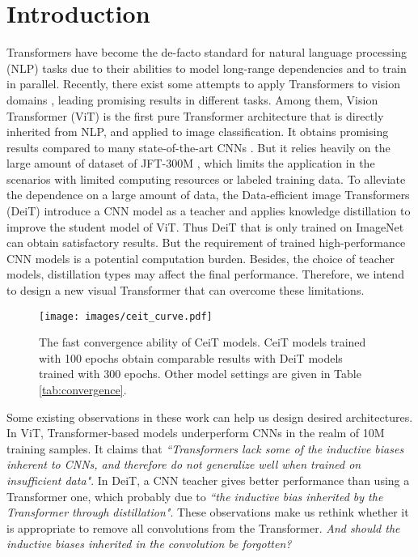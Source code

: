 \documentclass[10pt,twocolumn,letterpaper]{article}
\begin{document}
\section{Introduction}

Transformers \cite{DBLP:conf/nips/VaswaniSPUJGKP17} have become the de-facto standard for natural language processing (NLP) tasks due to their abilities to model long-range dependencies and to train in parallel. Recently, there exist some attempts to apply Transformers to vision domains \cite{DBLP:conf/icml/ChenRC0JLS20,dosovitskiy2021an,DBLP:journals/corr/abs-2012-12877,DBLP:conf/eccv/CarionMSUKZ20,zhu2021deformable,DBLP:journals/corr/abs-2012-00364,DBLP:journals/corr/abs-2012-15840}, leading promising results in different tasks. Among them, Vision Transformer (ViT) \cite{dosovitskiy2021an} is the first pure Transformer architecture that is directly inherited from NLP, and applied to image classification. 
It obtains promising results compared to many state-of-the-art CNNs \cite{DBLP:conf/eccv/MahajanGRHPLBM18,DBLP:conf/cvpr/XieLHL20,DBLP:conf/eccv/KolesnikovBZPYG20}. 
But it relies heavily on the large amount of dataset of JFT-300M \cite{DBLP:conf/iccv/SunSSG17}, which limits the application in the scenarios with limited computing resources or labeled training data.
To alleviate the dependence on a large amount of data, the Data-efficient image Transformers (DeiT) \cite{DBLP:journals/corr/abs-2012-12877} introduce a CNN model as a teacher and applies knowledge distillation \cite{DBLP:journals/corr/HintonVD15} to improve the student model of ViT. Thus DeiT that is only trained on ImageNet can obtain satisfactory results. But the requirement of trained high-performance CNN models is a potential computation burden. Besides, the choice of teacher models, distillation types may affect the final performance. Therefore, we 
intend to design a new visual Transformer that can overcome these limitations.



\begin{figure}[t!]
  \centering
  \texttt{[image: images/ceit\_curve.pdf]}
  \caption{The fast convergence ability of CeiT models. CeiT models trained with 100 epochs obtain comparable results with DeiT models trained with 300 epochs. Other model settings are given in Table \ref{tab:convergence}.}
  \label{fig:curve}
\end{figure}

Some existing observations in these work can help us design desired architectures. In ViT, Transformer-based models underperform CNNs in the realm of 10M training samples. It claims that \textit{``Transformers lack some of the inductive biases inherent to CNNs, and therefore do not generalize well when trained on insufficient data"}. In DeiT, a CNN teacher gives better performance than using a Transformer one, which probably due to \textit{``the inductive bias inherited by the Transformer through distillation"}. These observations make us rethink whether it is appropriate to remove all convolutions from the Transformer. \textit{And should the inductive biases inherited in the convolution be forgotten?}
\end{document}
